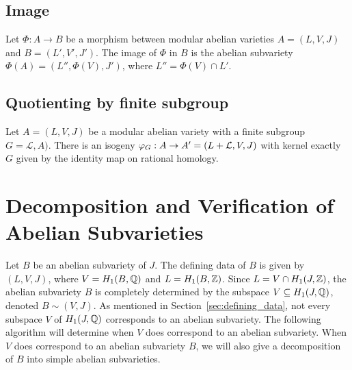 \subsection{Image}%
\label{sub:image}

Let $\Phi:A\to B$ be a morphism between modular abelian varieties $A=(L, V, J)$
and $B=(L', V', J')$. The image of $\Phi$ in $B$ is the abelian subvariety
$\Phi(A)=(L'', \Phi(V), J')$, where $L''=\Phi(V)\cap L'$.


\subsection{Quotienting by finite subgroup}%
\label{sub:quotienting_by_finite_subgroup}

Let $A=(L, V, J)$ be a modular abelian variety with a finite subgroup
$G=\mathcal{L}, A)$. There is an isogeny $\varphi_G: A\to A'=(L+\mathcal{L}, V,
J)$ with kernel exactly $G$ given by the identity map on rational homology.



\section{Decomposition and Verification of Abelian Subvarieties}
\label{sec:decomp_verify}

Let $B$ be an abelian subvariety of $J$. The defining data of $B$ is given by
$(L, V, J)$, where $V=H_1(B,\mathbb{Q})$ and $L = H_1(B, \mathbb{Z})$. Since $L = V\cap
H_1(J, \mathbb{Z})$, the abelian subvariety $B$ is completely determined by the
subspace $V\subseteq H_1(J, \mathbb{Q})$, denoted $B\sim (V, J)$. As mentioned in
Section~\ref{sec:defining_data}, not every subspace $V$ of $H_1(J, \mathbb{Q})$
corresponds to an abelian subvariety. The following algorithm will determine
when $V$ does correspond to an abelian subvariety. When $V$ does correspond to
an abelian subvariety $B$, we will also give a decomposition of $B$ into simple
abelian subvarieties.

